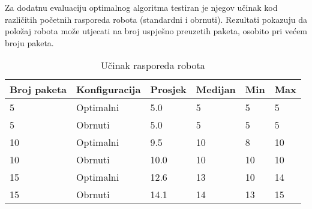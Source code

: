 \documentclass{fer}
\begin{document}
Za dodatnu evaluaciju optimalnog algoritma testiran je njegov učinak kod različitih početnih rasporeda robota (standardni i obrnuti). Rezultati pokazuju da položaj robota može utjecati na broj uspješno preuzetih paketa, osobito pri većem broju paketa.

\begin{table}[h]
\centering
\caption{Učinak rasporeda robota}
\begin{tabular}{@{}llllll@{}}
\toprule
Broj paketa & Konfiguracija & Prosjek & Medijan & Min & Max \\
\midrule
5 & Optimalni & 5.0 & 5 & 5 & 5 \\
5 & Obrnuti & 5.0 & 5 & 5 & 5 \\
10 & Optimalni & 9.5 & 10 & 8 & 10 \\
10 & Obrnuti & 10.0 & 10 & 10 & 10 \\
15 & Optimalni & 12.6 & 13 & 10 & 14 \\
15 & Obrnuti & 14.1 & 14 & 13 & 15 \\
\bottomrule
\end{tabular}
\end{table}
\end{document}
